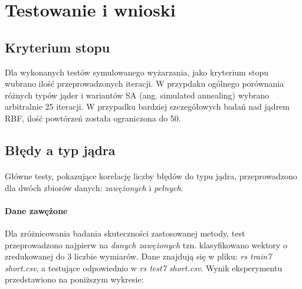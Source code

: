 \documentclass{article}
\begin{document}
\pagebreak
\section{Testowanie i wnioski}
\subsection{Kryterium stopu}
Dla wykonanych testów symulowanego wyżarzania, jako kryterium stopu wubrano ilość przeprowadzonych iteracji. W przypdaku ogólnego porównania różnych typów jąder i wariantów SA (ang. simulated annealing) wybrano arbitralnie 25 iteracji. W przypadku bardziej szczegółowych badań nad jądrem RBF, ilość powtórzeń została ograniczona do 50.
\subsection{Błędy a typ jądra}
\paragraph{}
Główne testy, pokazujące korelację liczby błędów do typu jądra, przeprowadzono dla dwóch zbiorów danych: \textit{zawężonych} i \textit{pełnych}.
\paragraph {Dane zawężone} Dla zróżnicowania badania skuteczności zastosowanej metody, test przeprowadzono najpierw na \textit{danych zawężonych} tzn. klasyfikowano wektory o zredukowanej do 3 liczbie wymiarów. Dane znajdują się w pliku: \textit{rs train7 short.csv}, a testujące odpowiednio w \textit{rs test7 short.csv}. Wynik eksperymentu przedstawiono na poniższym wykresie:
\pgfplotsset{width=6cm,compat=1.4}
\begin{center}
\end{center}
\end{document}
